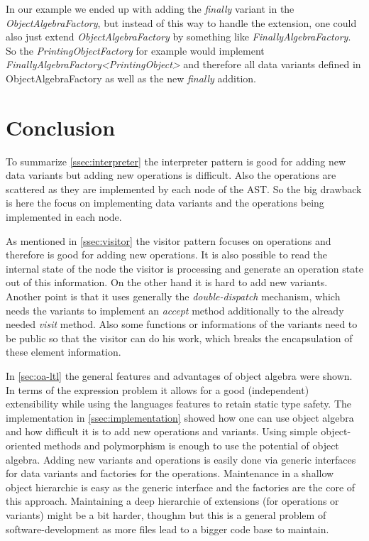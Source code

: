 \documentclass{llncs}
\begin{document}
In our example we ended up with adding the \emph{finally} variant in the \emph{ObjectAlgebraFactory}, but instead of this way to handle the extension, one could also just extend \emph{ObjectAlgebraFactory} by something like \emph{FinallyAlgebraFactory}. So the \emph{PrintingObjectFactory} for example would implement \emph{FinallyAlgebraFactory\textless PrintingObject\textgreater} and therefore all data variants defined in ObjectAlgebraFactory as well as the new \emph{finally} addition.


\section{Conclusion} \label{sec:conclusion}
To summarize \autoref{ssec:interpreter} the interpreter pattern is good for adding new data variants but adding new operations is difficult. Also the operations are scattered as they are implemented by each node of the AST. So the big drawback is here the focus on implementing data variants and the operations being implemented in each node.

As mentioned in \autoref{ssec:visitor} the visitor pattern focuses on operations and therefore is good for adding new operations. It is also possible to read the internal state of the node the visitor is processing and generate an operation state out of this information. On the other hand it is hard to add new variants. Another point is that it uses generally the \emph{double-dispatch} mechanism, which needs the variants to implement an \emph{accept} method additionally to the already needed \emph{visit} method. Also some functions or informations of the variants need to be public so that the visitor can do his work, which breaks the encapsulation of these element information.

In \autoref{sec:oa-ltl} the general features and advantages of object algebra were shown. In terms of the expression problem it allows for a good (independent) extensibility while using the languages features to retain static type safety. The implementation in \autoref{ssec:implementation} showed how one can use object algebra and how difficult it is to add new operations and variants. Using simple object-oriented methods and polymorphism is enough to use the potential of object algebra. Adding new variants and operations is easily done via generic interfaces for data variants and factories for the operations. Maintenance in a shallow object hierarchie is easy as the generic interface and the factories are the core of this approach. Maintaining a deep hierarchie of extensions (for operations or variants) might be a bit harder, thoughm but this is a general problem of software-development as more files lead to a bigger code base to maintain. 
\end{document}

